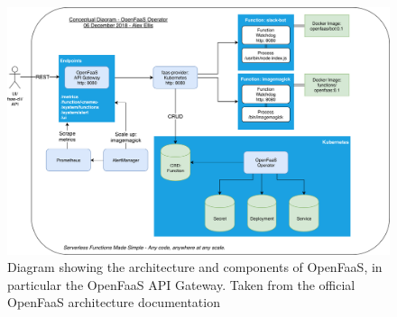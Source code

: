 \begin{figure}
    \centering
    \includegraphics[width=14cm]{graphics/diagrams/openfaas-gateway-architecture.png}
    \caption{Diagram showing the architecture and components of OpenFaaS, in particular the OpenFaaS API Gateway. Taken from the official OpenFaaS architecture documentation\cite{openfaas-gateway}}
    \label{fig:openfaas-gateway-diagram}
\end{figure}


